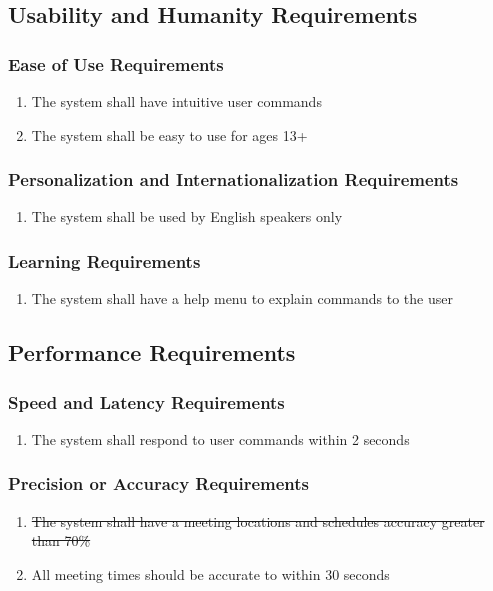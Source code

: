 \documentclass[12pt, titlepage]{article}
\begin{document}
\subsection{Usability and Humanity Requirements}
\subsubsection{Ease of Use Requirements}
\begin{enumerate}[start=1, label={UH\arabic*.}]
    \item The system shall have intuitive user commands
    \item The system shall be easy to use for ages 13+
\end{enumerate}
\subsubsection{Personalization and Internationalization Requirements}
\begin{enumerate}[start=3, label={UH\arabic*.}]
    \item The system shall be used by English speakers only
\end{enumerate}
\subsubsection{Learning Requirements}
\begin{enumerate}[start=4, label={UH\arabic*.}]
    \item The system shall have a help menu to explain commands to the user
\end{enumerate}

\subsection{Performance Requirements}
\subsubsection{Speed and Latency Requirements}
\begin{enumerate}[start=1, label={P\arabic*.}]
    \item The system shall respond to user commands within 2 seconds
\end{enumerate}
\subsubsection{Precision or Accuracy Requirements}
\begin{enumerate}[start=2, label={P\arabic*.}]
    \item \sout{The system shall have a meeting locations and schedules accuracy greater than 70\%}
    \item All meeting times should be accurate to within 30 seconds
\end{enumerate}
\end{document}

